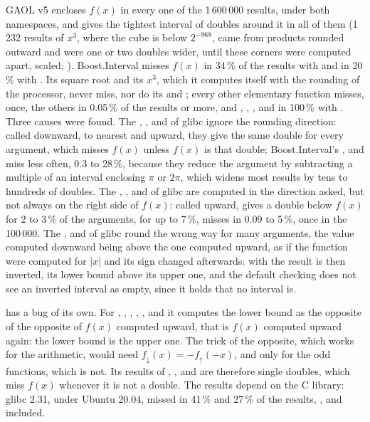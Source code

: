 \medskip
GAOL v5 encloses $f(x)$ in every one of the 1\,600\,000 results, under both
namespaces, and gives the tightest interval of doubles around it in all of
them (1\,232 results of $x^3$, where the cube is below $2^{-968}$, came from
products rounded outward and were one or two doubles wider, until these
corners were computed apart, scaled; ). Boost.Interval
misses $f(x)$ in 34\,\% of the results with  and
in 20\,\% with . Its square root and its $x^3$,
which it computes itself with the rounding of the processor, never miss,
nor do its  and ; every other elementary function
misses,  once, the others in 0.05\,\% of the results or more, and
, , ,  and  in
100\,\% with . Three causes were found. The
, ,  and  of glibc ignore the
rounding direction: called downward, to nearest and upward, they give the
same double for every argument, which misses $f(x)$ unless $f(x)$ is that
double; Boost.Interval's ,  and  miss less
often, 0.3 to 28\,\%, because they reduce the argument by subtracting a
multiple of an interval enclosing $\pi$ or $2\pi$, which widens most results
by tens to hundreds of doubles. The , ,  and
 of glibc are computed in the direction asked, but not always on
the right side of $f(x)$: called upward,  gives a double below
$f(x)$ for 2 to 3\,\% of the arguments,  for up to 7\,\%,
 misses in 0.09 to 5\,\%,  once in the 100\,000. The
,  and  of glibc round the wrong way for
many arguments, the value computed downward being above the one computed
upward, as if the function were computed for $|x|$ and its sign changed
afterwards: with  the result is then inverted,
its lower bound above its upper one, and the default checking does not see
an inverted interval as empty, since it holds that no interval is.

\begin{Rem}
 has a bug of its own. For ,
, , , ,  and
 it computes the lower bound as the opposite of the opposite of
$f(x)$ computed upward, that is $f(x)$ computed upward again: the lower
bound is the upper one. The trick of the opposite, which works for the
arithmetic, would need $f_{\downarrow}(x) = -f_{\uparrow}(-x)$, and only for
the odd functions, which  is not. Its results of ,
,  and  are therefore single doubles,
which miss $f(x)$ whenever it is not a double. The results depend on the C
library: glibc 2.31, under Ubuntu 20.04, missed in 41\,\% and 27\,\% of the
results, ,  and  included.
\end{Rem}

